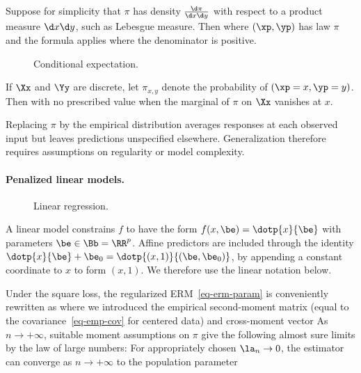 Suppose for simplicity that $\pi$ has density $\frac{\d \pi}{\d x \d y}$ with respect to a product measure $\d x \d y$, such as Lebesgue measure. Then
where $(\xp,\yp)$ has law $\pi$ and the formula applies where the denominator is positive.


\begin{figure}[tbp]
\centering
{}
\caption{Conditional expectation.}
\label{fig-bound-regul}
\end{figure}

If $\Xx$ and $\Yy$ are discrete, let $\pi_{x,y}$ denote the probability of $(\xp=x,\yp=y)$. Then
with no prescribed value when the marginal of $\pi$ on $\Xx$ vanishes at $x$.

Replacing $\pi$ by the empirical distribution averages responses at each observed input but leaves predictions unspecified elsewhere. Generalization therefore requires assumptions on regularity or model complexity.


   
\paragraph{Penalized linear models.}

\begin{figure}[tbp]
\centering
{}
\caption{Linear regression.}
\label{fig-review-ml-linear-fit}
\end{figure}
A linear model constrains $f$ to have the form $f(x,\be)=\dotp{x}{\be}$ with parameters $\be \in \Bb=\RR^p$. Affine predictors are included through the identity $\dotp{x}{\be}+\be_0=\dotp{(x,1)}{(\be,\be_0)}$, by appending a constant coordinate to $x$ to form $(x,1)$. We therefore use the linear notation below.

Under the square loss, the regularized ERM~\eqref{eq-erm-param} is conveniently rewritten as 
where we introduced the empirical second-moment matrix (equal to the covariance~\eqref{eq-emp-cov} for centered data) and cross-moment vector
As $n\to+\infty$, suitable moment assumptions on $\pi$ give the following almost sure limits by the law of large numbers:
For appropriately chosen $\la_n \rightarrow 0$, the estimator can converge as $n \rightarrow +\infty$ to the population parameter

